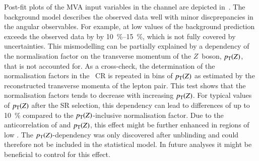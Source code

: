 Post-fit plots of the MVA input variables in the \hadhad channel are depicted
in~. The background model describes the observed
data well with minor discprepancies in the angular observables. For example, at
low values of \dRtautau the background prediction exceeds the observed data by
by \SIrange{10}{15}{\percent}, which is not fully covered by uncertainties. This
mismodelling can be partially explained by a dependency of the \ZHF
normalisation factor on the transverse momentum of the $Z$~boson, $p_{\text{T}}(Z)$, that
is not accounted for. As a cross-check, the determination of the normalisation
factors in the \ZHF~CR is repeated in bins of $p_{\text{T}}(Z)$ as estimated by the
reconstructed transverse momenta of the lepton pair. This test shows that the
\ZHF normalisation factors tends to decrease with increasing $p_{\text{T}}(Z)$. For
typical values of $p_{\text{T}}(Z)$ after the \hadhad SR selection, this dependency can
lead to differences of up to \SI{10}{\percent} compared to the
$p_{\text{T}}(Z)$-inclusive normalisation factor. Due to the anticorrelation of \dRtautau
and $p_{\text{T}}(Z)$, this effect might be further enhanced in regions of low
\dRtautau. The $p_{\text{T}}(Z)$-dependency was only discovered after unblinding and
could therefore not be included in the statistical model. In future analyses it
might be beneficial to control for this effect.


